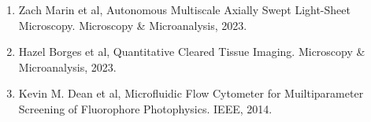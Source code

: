 \begin{enumerate}
\item Zach Marin et al, Autonomous Multiscale Axially Swept Light-Sheet Microscopy. Microscopy \& Microanalysis, 2023.
\item Hazel Borges et al, Quantitative Cleared Tissue Imaging. Microscopy \& Microanalysis, 2023.
\item Kevin M. Dean et al, Microfluidic Flow Cytometer for Muiltiparameter Screening of Fluorophore Photophysics. IEEE, 2014.
\end{enumerate}